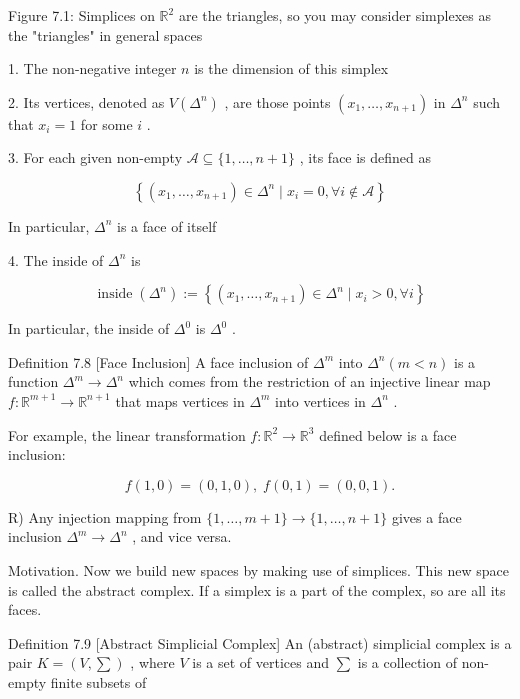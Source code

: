 Figure 7.1: Simplices on \({\mathbb{R}}^{2}\) are the triangles, so you may consider simplexes as the "triangles" in general spaces

1. The non-negative integer \(n\) is the dimension of this simplex

2. Its vertices, denoted as \(V\left( {\Delta }^{n}\right)\) , are those points \(\left( {{x}_{1},\ldots ,{x}_{n + 1}}\right)\) in \({\Delta }^{n}\) such that \({x}_{i} = 1\) for some \(i\) .

3. For each given non-empty \(\mathcal{A} \subseteq  \{ 1,\ldots ,n + 1\}\) , its face is defined as

\[
\left\{  {\left( {{x}_{1},\ldots ,{x}_{n + 1}}\right)  \in  {\Delta }^{n} \mid  {x}_{i} = 0,\forall i \notin  \mathcal{A}}\right\}
\]

In particular, \({\Delta }^{n}\) is a face of itself

4. The inside of \({\Delta }^{n}\) is

\[
\operatorname{inside}\left( {\Delta }^{n}\right)  \mathrel{\text{ := }} \left\{  {\left( {{x}_{1},\ldots ,{x}_{n + 1}}\right)  \in  {\Delta }^{n} \mid  {x}_{i} > 0,\forall i}\right\}
\]

In particular, the inside of \({\Delta }^{0}\) is \({\Delta }^{0}\) .

Definition 7.8 [Face Inclusion] A face inclusion of \({\Delta }^{m}\) into \({\Delta }^{n}\left( {m < n}\right)\) is a function \({\Delta }^{m} \rightarrow  {\Delta }^{n}\) which comes from the restriction of an injective linear map \(f : {\mathbb{R}}^{m + 1} \rightarrow  {\mathbb{R}}^{n + 1}\) that maps vertices in \({\Delta }^{m}\) into vertices in \({\Delta }^{n}\) .

For example, the linear transformation \(f : {\mathbb{R}}^{2} \rightarrow  {\mathbb{R}}^{3}\) defined below is a face inclusion:

\[
f\left( {1,0}\right)  = \left( {0,1,0}\right) ,\;f\left( {0,1}\right)  = \left( {0,0,1}\right) .
\]

R) Any injection mapping from \(\{ 1,\ldots ,m + 1\}  \rightarrow  \{ 1,\ldots ,n + 1\}\) gives a face inclusion \({\Delta }^{m} \rightarrow  {\Delta }^{n}\) , and vice versa.

Motivation. Now we build new spaces by making use of simplices. This new space is called the abstract complex. If a simplex is a part of the complex, so are all its faces.

Definition 7.9 [Abstract Simplicial Complex] An (abstract) simplicial complex is a pair \(K = \left( {V,\sum }\right)\) , where \(V\) is a set of vertices and \(\sum\) is a collection of non-empty finite subsets of

